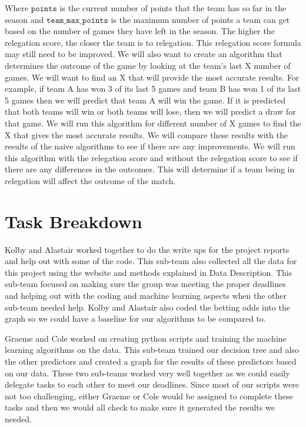 \documentclass[conference]{IEEEtran}
\begin{document}
Where $\mathtt{points}$ is the current number of points that the team has so far in the season and $\mathtt{team\_max\_points}$ is the maximum number of points a team can get based on the number of games they have left in the season. The higher the relegation score, the closer the team is to relegation. This relegation score formula may still need to be improved.
We will also want to create an algorithm that determines the outcome of the game by looking at the team's last X number of games. We will want to find an X that will provide the most accurate results. For example, if team A has won 3 of its last 5 games and team B has won 1 of its last 5 games then we will predict that team A will win the game. If it is predicted that both teams will win or both teams will lose, then we will predict a draw for that game. We will run this algorithm for different number of X games to find the X that gives the most accurate results. We will compare these results with the results of the naive algorithms to see if there are any improvements. We will run this algorithm with the relegation score and without the relegation score to see if there are any differences in the outcomes. This will determine if a team being in relegation will affect the outcome of the match. 

\section{Task Breakdown}
Kolby and Alastair worked together to do the write ups for the project reports and help out with some of the code. This sub-team also collected all the data for this project using the website and methods explained in Data Description. This sub-team focused on making sure the group was meeting the proper deadlines and helping out with the coding and machine learning aspects when the other sub-team needed help. Kolby and Alastair also coded the betting odds into the graph so we could have a baseline for our algorithms to be compared to.

Graeme and Cole worked on creating python scripts and training the machine learning algorithms on the data. This sub-team trained our decision tree and also the other predictors and created a graph for the results of these predictors based on our data. These two sub-teams worked very well together as we could easily delegate tasks to each other to meet our deadlines. Since most of our scripts were not too challenging, either Graeme or Cole would be assigned to complete these tasks and then we would all check to make sure it generated the results we needed.
\end{document}
